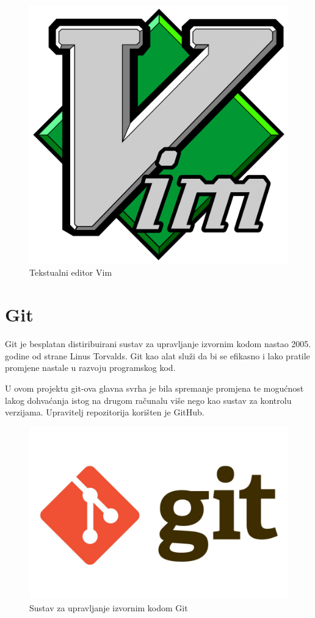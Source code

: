 \documentclass[times, utf8, zavrsni]{fer}
\begin{document}
\begin{figure}[h]
\includegraphics[scale=0.1]{vim.png}
\centering
\caption{Tekstualni editor Vim}
\centering
\end{figure}

\section{Git}
Git je besplatan distiribuirani sustav za upravljanje izvornim kodom nastao 2005. godine od strane Linus Torvalds. Git kao alat služi da bi se efikasno i lako pratile promjene nastale u razvoju programskog kod.\par
U ovom projektu git-ova glavna svrha je bila spremanje promjena te mogućnost lakog dohvaćanja istog na drugom računalu više nego kao sustav za kontrolu verzijama. Upravitelj repozitorija korišten je GitHub.

\begin{figure}[h]
\includegraphics[scale=0.2]{git.jpg}
\centering
\caption{Sustav za upravljanje izvornim kodom Git}
\centering
\end{figure}
\end{document}
